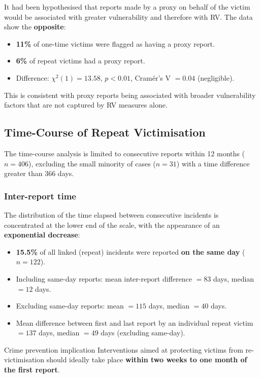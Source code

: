 \documentclass[11pt,a4paper,openany]{report}
\theoremstyle{definition}
\theoremstyle{plain}
\theoremstyle{remark}
\begin{document}
It had been hypothesised that reports made by a proxy on behalf of the victim would be associated with greater vulnerability and therefore with RV. The data show the \textbf{opposite}:

\begin{itemize}
    \item \textbf{11\%} of one-time victims were flagged as having a proxy report.
    \item \textbf{6\%} of repeat victims had a proxy report.
    \item Difference: $\chi^2(1) = 13.58$, $p < 0.01$, Cramér's V $= 0.04$ (negligible).
\end{itemize}

This is consistent with proxy reports being associated with broader vulnerability factors that are not captured by RV measures alone.

\subsection{Time-Course of Repeat Victimisation}

The time-course analysis is limited to consecutive reports within 12 months ($n = 406$), excluding the small minority of cases ($n = 31$) with a time difference greater than 366 days.

\subsubsection*{Inter-report time}

The distribution of the time elapsed between consecutive incidents is concentrated at the lower end of the scale, with the appearance of an \textbf{exponential decrease}:

\begin{itemize}
    \item \textbf{15.5\%} of all linked (repeat) incidents were reported \textbf{on the same day} ($n = 122$).
    \item Including same-day reports: mean inter-report difference $= 83$ days, median $= 12$ days.
    \item Excluding same-day reports: mean $= 115$ days, median $= 40$ days.
    \item Mean difference between first and last report by an individual repeat victim $= 137$ days, median $= 49$ days (excluding same-day).
\end{itemize}

\begin{actionboxT}{Crime prevention implication}
Interventions aimed at protecting victims from re-victimisation should ideally take place \textbf{within two weeks to one month of the first report}.
\end{actionboxT}
\end{document}
